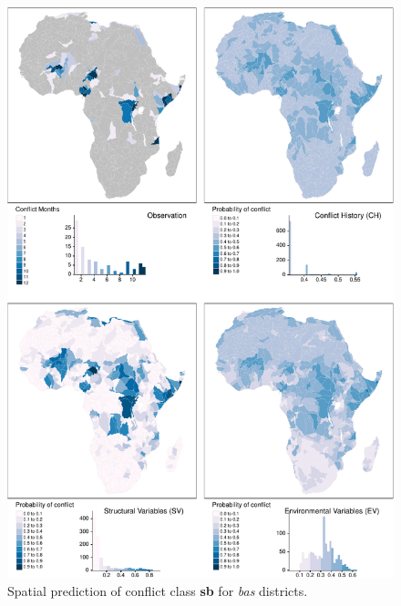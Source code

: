 \documentclass[a4paper,11pt]{article}
\begin{document}
\begin{tiny}
\begin{figure}[H]
{\centering \includegraphics{thesis_files/figure-latex/appendix-spatial-bas-sb-1} 

}

\caption[Spatial prediction of conflict class \textbf{sb} for \textit{bas} districts.]{Spatial prediction of conflict class \textbf{sb} for \textit{bas} districts.}\label{fig:appendix-spatial-bas-sb}
\end{figure}
\begin{figure}[H]


\end{figure}
\end{tiny}
\end{document}
